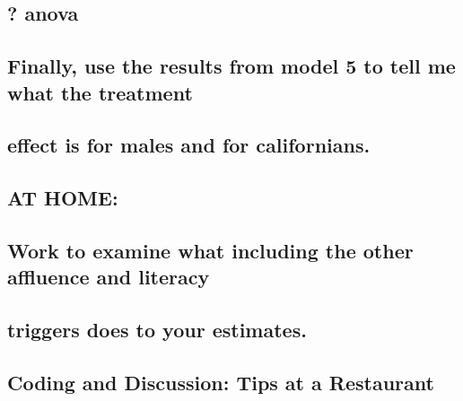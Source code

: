\documentclass[
]{article}
\theoremstyle{definition}
\theoremstyle{definition}
\theoremstyle{definition}
\theoremstyle{definition}
\theoremstyle{remark}
\begin{document}
\subsection{? anova}\label{anova}

\subsection{Finally, use the results from model 5 to tell me what the treatment}\label{finally-use-the-results-from-model-5-to-tell-me-what-the-treatment}

\subsection{effect is for males and for californians.}\label{effect-is-for-males-and-for-californians.}

\subsection{}\label{section}

\subsection{AT HOME:}\label{at-home}

\subsection{Work to examine what including the other affluence and literacy}\label{work-to-examine-what-including-the-other-affluence-and-literacy}

\subsection{triggers does to your estimates.}\label{triggers-does-to-your-estimates.}

\subsection{}\label{section-1}

\subsection{Coding and Discussion: Tips at a Restaurant}\label{coding-and-discussion-tips-at-a-restaurant}
\end{document}
